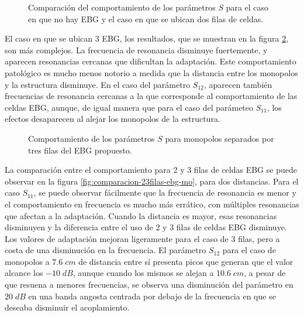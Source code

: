 \begin{figure}[h]
	\centering 
	\hspace{0pt}
	\caption{Comparación del comportamiento de los parámetros $S$ para el caso en que no hay EBG y el caso en que se ubican dos filas de celdas.}
	\label{fig:comparacion-2filas-ebg-mo}
\end{figure} 

El caso en que se ubican 3 EBG, los resultados, que se muestran en la figura \ref{fig:comparacion-3filas-ebg-mo}, son más complejos. La frecuencia de resonancia disminuye fuertemente, y aparecen resonancias cercanas que dificultan la adaptación. Este comportamiento patológico es mucho menos notorio a medida que la distancia entre los monopolos y la estructura disminuye. En el caso del parámetro $S_{12}$, aparecen también frecuencias de resonancia cercanas a la que corresponde al comportamiento de las celdas EBG, aunque, de igual manera que para el caso del parámeteo $S_{11}$, los efectos desaparecen al alejar los monopolos de la estructura.

\begin{figure}[h]
	\centering 
	\hspace{0pt}
	\caption{Comportamiento de los parámetros $S$ para monopolos separados por tres filas del EBG propuesto.}
	\label{fig:comparacion-3filas-ebg-mo}
\end{figure}

La comparación entre el comportamiento para 2 y 3 filas de celdas EBG se puede observar en la figura \ref{fig:comparacion-23filas-ebg-mo}, para dos distancias. Para el caso $S_{11}$, se puede observar fácilmente que la frecuencia de resonancia es menor y el comportamiento en frecuencia es mucho más errático, con múltiples resonancias que afectan a la adaptación. Cuando la distancia es mayor, esas resonancias disminuyen y la diferencia entre el uso de 2 y 3 filas de celdas EBG disminuye. Los valores de adaptación mejoran ligeramente para el caso de 3 filas, pero a costa de una disminución en la frecuencia. El parámetro $S_{12}$ para el caso de monopolos a $7.6\; cm$ de distancia entre sí presenta picos que generan que el valor alcance los $-10\;dB$, aunque cuando los mismos se alejan a $10.6\;cm$, a pesar de que resuena a menores frecuencias, se observa una disminución del parámetro en $20\; dB$ en una banda angosta centrada por debajo de la frecuencia en que se deseaba disminuir el acoplamiento.

